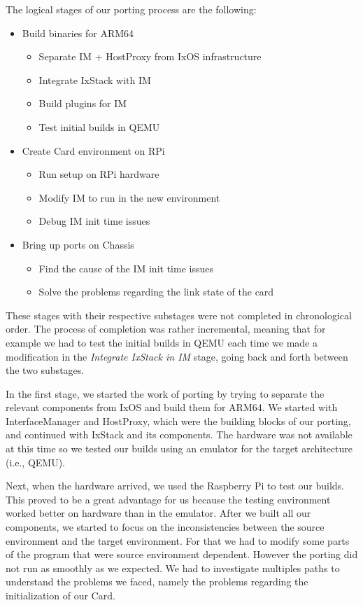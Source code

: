 The logical stages of our porting process are the following:
\begin{itemize}
    \item Build binaries for ARM64
    \begin{itemize}
        \item Separate IM + HostProxy from IxOS infrastructure
        \item Integrate IxStack with IM
        \item Build plugins for IM
        \item Test initial builds in QEMU
    \end{itemize}
    \item Create Card environment on RPi
    \begin{itemize}
        \item Run setup on RPi hardware
        \item Modify IM to run in the new environment
        \item Debug IM init time issues
    \end{itemize}
    \item Bring up ports on Chassis
    \begin{itemize}
        \item Find the cause of the IM init time issues
        \item Solve the problems regarding the link state of the card
    \end{itemize}
\end{itemize}
These stages with their respective substages were not completed in chronological
order. The process of completion was rather incremental, meaning that for
example we had to test the initial builds in QEMU each time we made a
modification in the \textit{Integrate IxStack in IM} stage, going back and forth
between the two substages.

In the first stage, we started the work of porting by trying to separate the
relevant components from IxOS and build them for ARM64. We started with
InterfaceManager and HostProxy, which were the building blocks of our porting,
and continued with IxStack and its components. The hardware was not available
at this time so we tested our builds using an emulator for the target
architecture (i.e., QEMU).

Next, when the hardware arrived, we used the Raspberry Pi to test our builds.
This proved to be a great advantage for us because the testing environment
worked better on hardware than in the emulator. After we built all our
components, we started to focus on the inconsistencies between the source
environment and the target environment. For that we had to modify some parts of
the program that were source environment dependent. However the porting did not
run as smoothly as we expected. We had to investigate multiples paths to
understand the problems we faced, namely the problems regarding the
initialization of our Card.

